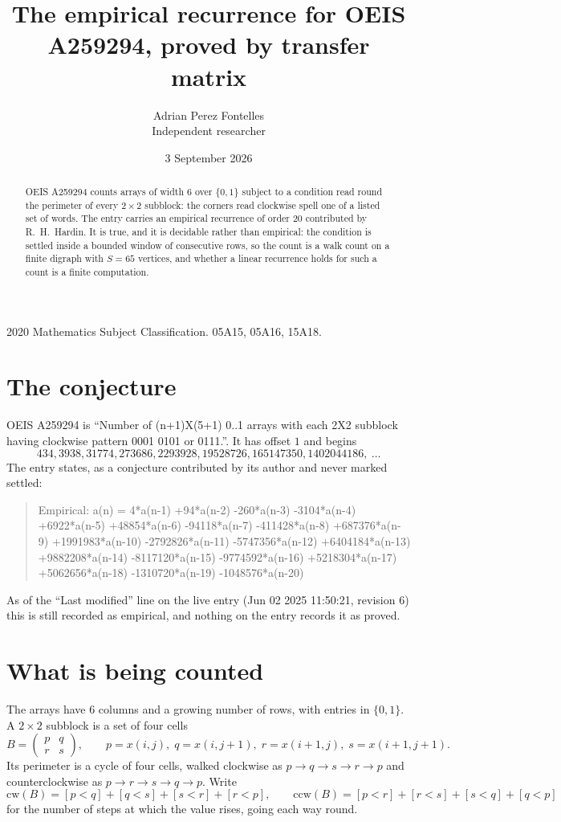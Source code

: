 \documentclass[11pt,a4paper]{article}
\title{The empirical recurrence for OEIS A259294, proved by transfer matrix}
\author{Adrian Perez Fontelles\\ \small Independent researcher}
\date{3 September 2026}
\theoremstyle{plain}
\theoremstyle{definition}
\begin{document}
\maketitle

\begin{abstract}
OEIS A259294 counts arrays of width $6$ over $\{0,1\}$ subject to a condition read round the
perimeter of every $2\times2$ subblock: the corners read clockwise spell one of a listed set of words. The entry carries an empirical recurrence of
order $20$ contributed by R.~H.~Hardin. It is true, and it is decidable rather than
empirical: the condition is settled inside a bounded window of consecutive rows, so the
count is a walk count on a finite digraph with $S=65$ vertices, and whether a linear
recurrence holds for such a count is a finite computation.
\end{abstract}

\noindent\small 2020 Mathematics Subject Classification. 05A15, 05A16, 15A18.\normalsize

\section{The conjecture}

OEIS A259294 is ``Number of (n+1)X(5+1) 0..1 arrays with each 2X2 subblock having clockwise pattern 0001 0101 or 0111.''. It has offset $1$ and begins
\[
434, 3938, 31774, 273686, 2293928, 19528726, 165147350, 1402044186,\ \dots
\]
The entry states, as a conjecture contributed by its author and never marked settled:
\begin{quote}
Empirical: a(n) = 4*a(n-1) +94*a(n-2) -260*a(n-3) -3104*a(n-4) +6922*a(n-5) +48854*a(n-6) -94118*a(n-7) -411428*a(n-8) +687376*a(n-9) +1991983*a(n-10) -2792826*a(n-11) -5747356*a(n-12) +6404184*a(n-13) +9882208*a(n-14) -8117120*a(n-15) -9774592*a(n-16) +5218304*a(n-17) +5062656*a(n-18) -1310720*a(n-19) -1048576*a(n-20)
\end{quote}
As of the ``Last modified'' line on the live entry (Jun 02 2025 11:50:21, revision 6) this is still
recorded as empirical, and nothing on the entry records it as proved.

\section{What is being counted}

The arrays have $6$ columns and a growing number of rows, with entries in $\{0,1\}$. A
$2\times2$ subblock is a set of four cells
\[
B=\begin{pmatrix} p & q \\ r & s \end{pmatrix},
\qquad p=x(i,j),\; q=x(i,j+1),\; r=x(i+1,j),\; s=x(i+1,j+1).
\]
Its perimeter is a cycle of four cells, walked clockwise as $p\to q\to s\to r\to p$ and
counterclockwise as $p\to r\to s\to q\to p$. Write
\[
\mathrm{cw}(B)=[p<q]+[q<s]+[s<r]+[r<p],\qquad
\mathrm{ccw}(B)=[p<r]+[r<s]+[s<q]+[q<p]
\]
for the number of steps at which the value rises, going each way round.
\end{document}
